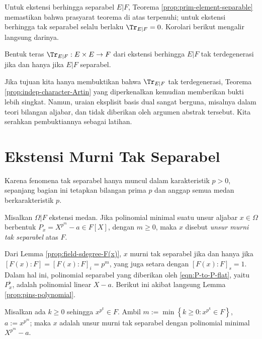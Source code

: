 Untuk ekstensi berhingga separabel $E|F$, Teorema \ref{prop:prim-element-separable} memastikan bahwa prasyarat teorema di atas terpenuhi; untuk ekstensi berhingga tak separabel selalu berlaku $\Tr_{E|F}=0$. Korolari berikut mengalir langsung darinya.
\begin{corollary}\label{prop:separable-discriminant}
	Bentuk teras $\Tr_{E|F}: E \times E \to F$ dari ekstensi berhingga $E|F$ tak terdegenerasi jika dan hanya jika $E|F$ separabel.
\end{corollary}

Jika tujuan kita hanya membuktikan bahwa $\Tr_{E|F}$ tak terdegenerasi, Teorema \ref{prop:indep-character-Artin} yang diperkenalkan kemudian memberikan bukti lebih singkat. Namun, uraian eksplisit basis dual sangat berguna, misalnya dalam teori bilangan aljabar, dan tidak diberikan oleh argumen abstrak tersebut. Kita serahkan pembuktiannya sebagai latihan.

\section{Ekstensi Murni Tak Separabel}\label{sec:pins}
Karena fenomena tak separabel hanya muncul dalam karakteristik $p > 0$, sepanjang bagian ini tetapkan bilangan prima $p$ dan anggap semua medan berkarakteristik $p$.
\begin{definition}
	Misalkan $\Omega|F$ ekstensi medan. Jika polinomial minimal suatu unsur aljabar $x \in \Omega$ berbentuk $P_x = X^{p^m}-a \in F[X]$, dengan $m \geq 0$, maka $x$ disebut \emph{unsur murni tak separabel} atas $F$.
\end{definition}
Dari Lemma \ref{prop:field-sdegree-F(x)}, $x$ murni tak separabel jika dan hanya jika $[F(x):F] = [F(x):F]_i = p^m$, yang juga setara dengan $[F(x):F]_s = 1$. Dalam hal ini, polinomial separabel yang diberikan oleh \eqref{eqn:P-to-P-flat}, yaitu $P^\flat_x$, adalah polinomial linear $X-a$. Berikut ini akibat langsung Lemma \ref{prop:pins-polynomial}.

\begin{proposition}
	Misalkan ada $k \geq 0$ sehingga $x^{p^k} \in F$. Ambil $m := \min\left\{k \geq 0 : x^{p^k} \in F \right\}$, $a := x^{p^m}$; maka $x$ adalah unsur murni tak separabel dengan polinomial minimal $X^{p^m}-a$.
\end{proposition}

